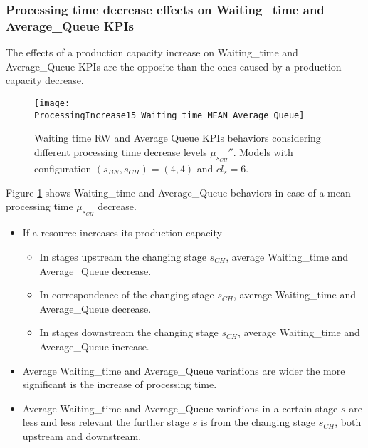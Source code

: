 \subsubsection{Processing time decrease effects on Waiting\_time and Average\_Queue KPIs}
The effects of a production capacity increase on Waiting\_time and Average\_Queue KPIs are the opposite than the ones caused by a production capacity decrease.
\begin{figure}[h] 
\centering
\texttt{[image: ProcessingIncrease15\_Waiting\_time\_MEAN\_Average\_Queue]}
\caption[Waiting time RW and Average Queue KPIs behaviors with different processing time decrease levels]{Waiting time RW and Average Queue KPIs behaviors considering different processing time decrease levels $\mu_{s_{CH}}''$. Models with configuration $(s_{BN},s_{CH})=(4,4)$ and $cl_s=6$.}
\label{fig:Waiting time RW and Average Queue KPIs behaviors with different processing time decrease levels}
\end{figure}
Figure \ref{fig:Waiting time RW and Average Queue KPIs behaviors with different processing time decrease levels} shows Waiting\_time and Average\_Queue behaviors in case of a mean processing time $\mu_{s_{CH}}$ decrease. 
\begin{itemize}
\item If a resource increases its production capacity 
\begin{itemize}
\item In stages upstream the changing stage $s_{CH}$, average Waiting\_time and Average\_Queue decrease.
\item In correspondence of the changing stage $s_{CH}$, average Waiting\_time and Average\_Queue decrease.
\item In stages downstream the changing stage $s_{CH}$, average Waiting\_time and Average\_Queue increase.
\end{itemize}
\item Average Waiting\_time and Average\_Queue variations are wider the more significant is the increase of processing time.
\item Average Waiting\_time and Average\_Queue variations in a certain stage $s$ are less and less relevant the further stage $s$ is from the changing stage $s_{CH}$, both upstream and downstream. 
\end{itemize}
